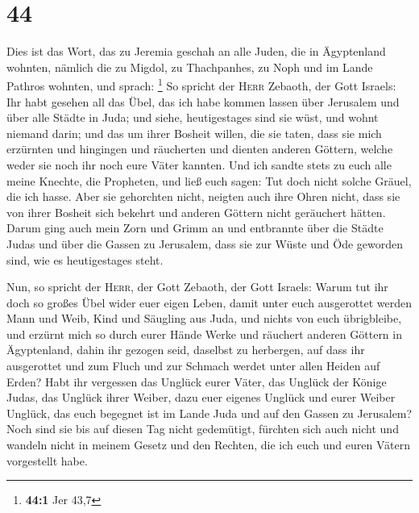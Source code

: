 \hypertarget{section-43}{%
\section{44}\label{section-43}}

 Dies ist das Wort, das zu Jeremia geschah an alle Juden,
die in Ägyptenland wohnten, nämlich die zu Migdol, zu Thachpanhes, zu
Noph und im Lande Pathros wohnten, und sprach: \footnote{\textbf{44:1}
  Jer 43,7}  So spricht der \textsc{Herr} Zebaoth, der
Gott Israels: Ihr habt gesehen all das Übel, das ich habe kommen lassen
über Jerusalem und über alle Städte in Juda; und siehe, heutigestages
sind sie wüst, und wohnt niemand darin;  und das um ihrer
Bosheit willen, die sie taten, dass sie mich erzürnten und hingingen und
räucherten und dienten anderen Göttern, welche weder sie noch ihr noch
eure Väter kannten.  Und ich sandte stets zu euch alle
meine Knechte, die Propheten, und ließ euch sagen: Tut doch nicht solche
Gräuel, die ich hasse.  Aber sie gehorchten nicht, neigten
auch ihre Ohren nicht, dass sie von ihrer Bosheit sich bekehrt und
anderen Göttern nicht geräuchert hätten.  Darum ging auch
mein Zorn und Grimm an und entbrannte über die Städte Judas und über die
Gassen zu Jerusalem, dass sie zur Wüste und Öde geworden sind, wie es
heutigestages steht.

 Nun, so spricht der \textsc{Herr}, der Gott Zebaoth, der
Gott Israels: Warum tut ihr doch so großes Übel wider euer eigen Leben,
damit unter euch ausgerottet werden Mann und Weib, Kind und Säugling aus
Juda, und nichts von euch übrigbleibe,  und erzürnt mich
so durch eurer Hände Werke und räuchert anderen Göttern in Ägyptenland,
dahin ihr gezogen seid, daselbst zu herbergen, auf dass ihr ausgerottet
und zum Fluch und zur Schmach werdet unter allen Heiden auf Erden?
 Habt ihr vergessen das Unglück eurer Väter, das Unglück
der Könige Judas, das Unglück ihrer Weiber, dazu euer eigenes Unglück
und eurer Weiber Unglück, das euch begegnet ist im Lande Juda und auf
den Gassen zu Jerusalem?  Noch sind sie bis auf diesen
Tag nicht gedemütigt, fürchten sich auch nicht und wandeln nicht in
meinem Gesetz und den Rechten, die ich euch und euren Vätern vorgestellt
habe.

